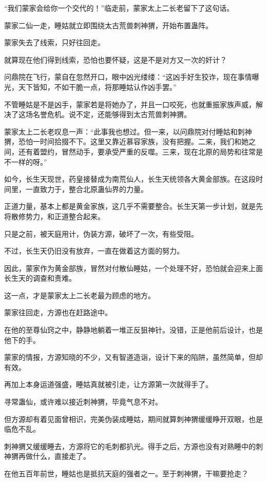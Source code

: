 \begin{this_body}
“我们蒙家会给你一个交代的！”临走前，蒙家太上二长老留下了这句话。

蒙家二仙一走，睡姑就立即围绕太古荒兽刺神猬，开始布置蛊阵。

蒙家失去了线索，只好往回走。

就算现在他们得到线索，恐怕也要怀疑，这是不是对方又一次的奸计？

问鼎院在飞行，蒙自在忽然开口，眼中凶光缕缕：“这凶手好生狡诈，现在事情曝光，天下皆知，不如干脆一点，将那睡姑认作凶手罢。”

不管睡姑是不是凶手，蒙家若是将她办了，并且一口咬死，也就重振家族声威，解决了这场名誉危机。说不定，还能够得到太古荒兽刺神猬。

蒙家太上二长老叹息一声：“此事我也想过。但一来，以问鼎院对付睡姑和刺神猬，恐怕一时间拾掇不下。这里又靠近慕容家族，没有把握。二来，我们和她之间，还有着盟约，冒然动手，要承受严重的反噬。三来，现在北原的局势和往常是不一样的呀。”

如今，长生天现世，药皇接替成为南荒仙人，长生天统领各大黄金部族。在这段时间里，一直致力于，整合北原蛊仙界的力量。

正道力量，基本上都是黄金家族，这几乎不需要整合。长生天第一步计划，就是先将散修势力，和正道整合起来。

只是之前，被天庭用计，伪装方源，破坏了一次，有些受阻。

不过，长生天仍旧没有放弃，一直在做着这方面的努力。

因此，蒙家作为黄金部族，冒然对付散仙睡姑，一个处理不好，恐怕就会迎来上面长生天的调查和责难。

这一点，才是蒙家太上二长老最为顾虑的地方。

蒙家往回走，方源也在赶路途中。

在他的至尊仙窍之中，静静地躺着一堆正反狙神针。没错，正是他前后设计，也是他下的手。

蒙家的情报，方源知晓的不少，又有智道造诣，设计下来的陷阱，虽然简单，但却有效。

再加上本身运道强盛，睡姑真就被引走，让方源第一次就得手了。

寻常蛊仙，或许难以接近刺神猬，毕竟气息不对。

但方源却有着见面曾相识，完美伪装成睡姑，期间就算刺神猬缓缓睁开双眼，也是临危不乱。

刺神猬又缓缓睡去，方源将它的毛刺都扒光。得手之后，方源也没有对熟睡中的刺神猬再做什么，直接走了。

在他五百年前世，睡姑也是抵抗天庭的强者之一。至于刺神猬，干嘛要抢走？


\end{this_body}
